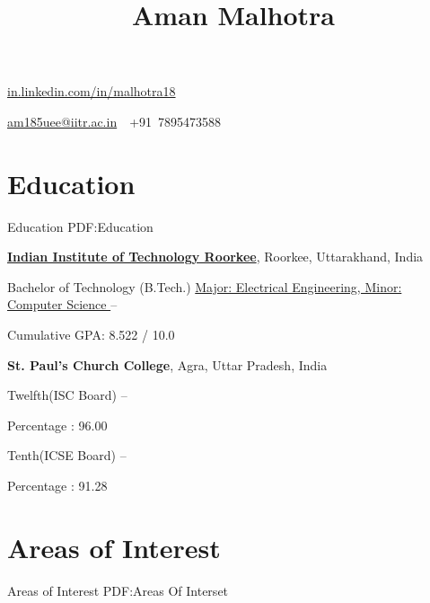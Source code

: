 \documentclass[a4paper,10pt,oneside]{article}
\begin{document}

\title{Aman Malhotra}

\begin{subtitle}
\color{RoyalBlue}
\href{http://in.linkedin.com/in/malhotra18}
{in.linkedin.com/in/malhotra18}
\par

\href{mailto:am185uee@iitr.ac.in}
{am185uee@iitr.ac.in}
\color{black}
\,\BulletSymbol\,
+91\ 7895473588
\end{subtitle}

\begin{body}


\section
{Education}
{Education}
{PDF:Education}

\href{http://www.iitr.ac.in/}
{\textbf{Indian Institute of Technology Roorkee}},
Roorkee, Uttarakhand, India

\SmallEntryGap
Bachelor of Technology (B.Tech.) 
\SmallEntryGap
\href{}
{Major: Electrical Engineering, Minor: Computer Science }
\hfill
{} --
\begin{detail}
\BulletItem
Cumulative GPA: 8.522 / 10.0
\end{detail}

\EntryGap
{\textbf{St. Paul's Church College},
Agra, Uttar Pradesh, India
\par
Twelfth(ISC Board)
\hfill
{} --
\begin{detail}
\BulletItem
Percentage : 96.00
\end{detail}
\SmallEntryGap
Tenth(ICSE Board)
\hfill
{} --
\begin{detail}
\BulletItem
Percentage : 91.28
\end{detail}


\section
{Areas of \newline Interest}
{Areas of Interest}
{PDF:Areas Of Interset}

}
\end{body}
\end{document}

